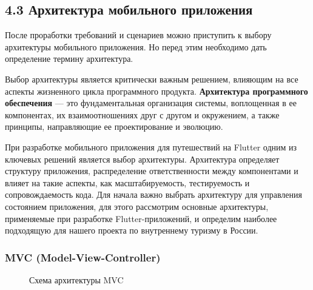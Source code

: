 \subsection*{4.3 Архитектура мобильного приложения}


После проработки требований и сценариев можно приступить к выбору архитектуры мобильного приложения. Но перед этим необходимо дать определение термину архитектура. 

Выбор архитектуры является критически важным решением, влияющим на все аспекты жизненного цикла программного продукта. \textbf{Архитектура программного обеспечения} — это фундаментальная организация системы, воплощенная в ее компонентах, их взаимоотношениях друг с другом и окружением, а также принципы, направляющие ее проектирование и эволюцию.


При разработке мобильного приложения для путешествий на Flutter одним из ключевых решений является выбор архитектуры. Архитектура определяет структуру приложения, распределение ответственности между компонентами и влияет на такие аспекты, как масштабируемость, тестируемость и сопровождаемость кода. Для начала важно выбрать архитектуру для управления состоянием приложения, для этого рассмотрим основные архитектуры, применяемые при разработке Flutter-приложений, и определим наиболее подходящую для нашего проекта по внутреннему туризму в России.

\subsubsection*{MVC (Model-View-Controller)}

\begin{figure}[H]
\centering
{}
\caption{Схема архитектуры MVC}
\label{fig:mvc}
\end{figure}

